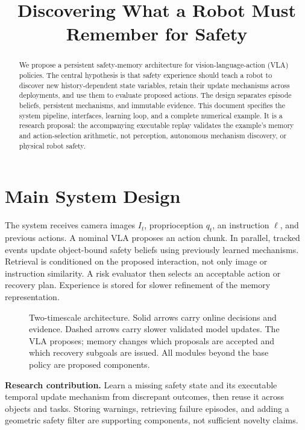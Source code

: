 \documentclass[10pt]{article}
\title{Discovering What a Robot Must Remember for Safety}
\author{}
\date{}
\begin{document}
\maketitle
\vspace{-2.5em}
\begin{abstract}
We propose a persistent safety-memory architecture for vision-language-action (VLA) policies. The central hypothesis is that safety experience should teach a robot to discover new history-dependent state variables, retain their update mechanisms across deployments, and use them to evaluate proposed actions. The design separates episode beliefs, persistent mechanisms, and immutable evidence. This document specifies the system pipeline, interfaces, learning loop, and a complete numerical example. It is a research proposal: the accompanying executable replay validates the example's memory and action-selection arithmetic, not perception, autonomous mechanism discovery, or physical robot safety.
\end{abstract}

\section{Main System Design}
The system receives camera images $I_t$, proprioception $q_t$, an instruction $\ell$, and previous actions. A nominal VLA proposes an action chunk. In parallel, tracked events update object-bound safety beliefs using previously learned mechanisms. Retrieval is conditioned on the proposed interaction, not only image or instruction similarity. A risk evaluator then selects an acceptable action or recovery plan. Experience is stored for slower refinement of the memory representation.

\begin{figure}[h!]
\centering
\resizebox{\linewidth}{!}{}
\caption{Two-timescale architecture. Solid arrows carry online decisions and evidence. Dashed arrows carry slower validated model updates. The VLA proposes; memory changes which proposals are accepted and which recovery subgoals are issued. All modules beyond the base policy are proposed components.}
\label{fig:pipeline}
\end{figure}

\textbf{Research contribution.} Learn a missing safety state and its executable temporal update mechanism from discrepant outcomes, then reuse it across objects and tasks. Storing warnings, retrieving failure episodes, and adding a geometric safety filter are supporting components, not sufficient novelty claims.
\end{document}
